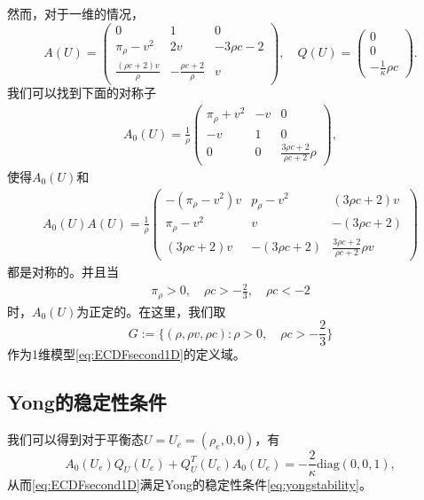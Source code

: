 然而，对于一维的情况，
\begin{equation*}
	A(U) = \left( \begin{array}{ccc}
		0 & 1 & 0 \\
		\pi_\rho - v^2 & 2v & -3 \rho c - 2 \\
		\frac{ (\rho c + 2) v}{\rho} & -  \frac{\rho c + 2}{\rho} & v 
	\end{array}\right), \quad
	Q(U) = \left( \begin{array}{c}
		0 \\ 0 \\-\frac{1}{\kappa} \rho c
	\end{array} \right).
\end{equation*}
我们可以找到下面的对称子
\begin{eqnarray}\label{31}
A_0(U) = \frac{1}{\rho} \left( \begin{array}{ccc}
	 \pi_\rho  +v^2 & -v & 0 \\ [2mm]
	-v & 1 & 0 \\[2mm]
	0 & 0 & \frac{3\rho c+2}{\rho c+2}\rho  \end{array} \right),
\end{eqnarray}
使得$A_0(U)$和
\begin{eqnarray*}
A_0(U) A(U) = \frac{1}{\rho} \left( \begin{array}{ccc}
		-(\pi_{\rho}-v^2)v & {p_\rho -v^2} & {(3\rho c + 2)v} \\[2mm]
		{\pi_\rho-v^2} & {v} & -{(3 \rho c+2)} \\[2mm]
		{(3 \rho c+ 2)v} & -{(3 \rho c+2)} & \frac{3\rho c+2}{\rho c + 2}\rho v
		\end{array} \right)
\end{eqnarray*}
都是对称的。并且当
\begin{eqnarray*}
\pi_\rho > 0 ,\quad \rho c > -\frac{2}{3}, \quad   \rho c < -2 
\end{eqnarray*}
时，$A_0(U)$为正定的。在这里，我们取
\begin{equation*}%
G := \{(\rho,\rho v, \rho c): \rho>0, \quad \rho c> - \frac{2}{3}\}
\end{equation*}
作为1维模型\eqref{eq:ECDFsecond1D}的定义域。

\subsection{Yong的稳定性条件}
我们可以得到对于平衡态$U=U_e = (\rho_e,0,0)$，有
\begin{equation}\label{32}
A_0(U_e)Q_U(U_e) + Q_U^T(U_e)A_0(U_e) =-\frac{2}{\kappa}\mbox{diag}(0, 0, 1),
\end{equation}
从而\eqref{eq:ECDFsecond1D}满足Yong的稳定性条件\eqref{eq:yongstability}\cite{yong1992singular,yong1999singular}。


